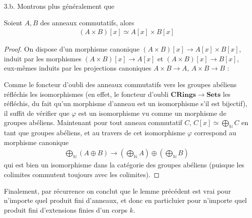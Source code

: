 \documentclass[11pt]{article}
\begin{document}
    \begin{question}{3.b.}
        Montrons plus généralement que
        \begin{lemm}
            Soient $A,B$ des anneaux commutatifs, alors
            \begin{align*}
                (A \times B)[x] \simeq A[x] \times B[x]
            \end{align*}
        \end{lemm}
        \begin{proof}
            On dispose d'un morphisme canonique $(A \times B)[x] \to A[x] \times B[x]$, induit par les morphismes $(A \times B)[x] \to A[x]$ et $(A \times B)[x] \to B[x]$, eux-mêmes induits par les projections canoniques $A \times B \to A$, $A \times B \to B$ :
            \begin{figure}[H]
                \centering
            \end{figure}
            Comme le foncteur d'oubli des anneaux commutatifs vers les groupes abéliens réfléchis les isomorphismes (en effet, le foncteur d'oubli $\mathbf{CRings} \to \mathbf{Sets}$ les réfléchis, du fait qu'un morphisme d'anneau est un isomorphisme s'il est bijectif), il suffit de vérifier que $\varphi$ est un isomorphisme vu comme un morphisme de groupes abéliens. Maintenant pour tout anneau commutatif $C$, $C[x] \simeq \bigoplus_{\mathbb{N}} C$ en tant que groupes abéliens, et au travers de cet isomorphisme $\varphi$ correspond au morphisme canonique
            \begin{align*}
                \bigoplus_{\mathbb{N}} (A \oplus B) \to \left(\bigoplus_{\mathbb{N}} A\right) \oplus \left(\bigoplus_{\mathbb{N}} B\right)
            \end{align*}
            qui est bien un isomorphisme dans la catégorie des groupes abéliens (puisque les colimites commutent toujours avec les colimites).
        \end{proof}
        Finalement, par récurrence on conclut que le lemme précédent est vrai pour n'importe quel produit fini d'anneaux, et donc en particluier pour n'importe quel produit fini d'extensions finies d'un corps $k$.
    \end{question}
\end{document}
